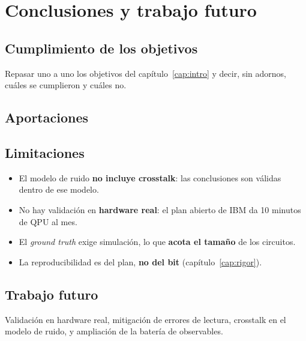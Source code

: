 \chapter{Conclusiones y trabajo futuro}
\label{cap:conclusiones}


\section{Cumplimiento de los objetivos}
\label{sec:cumplimiento}
Repasar uno a uno los objetivos del capítulo~\ref{cap:intro} y decir, sin adornos, cuáles se
cumplieron y cuáles no.

\section{Aportaciones}
\label{sec:aportaciones}

\section{Limitaciones}
\label{sec:limitaciones_finales}
\begin{itemize}
    \item El modelo de ruido \textbf{no incluye crosstalk}: las conclusiones son válidas
          dentro de ese modelo.
    \item No hay validación en \textbf{hardware real}: el plan abierto de IBM da 10 minutos
          de QPU al mes.
    \item El \textit{ground truth} exige simulación, lo que \textbf{acota el tamaño} de los
          circuitos.
    \item La reproducibilidad es del plan, \textbf{no del bit}
          (capítulo~\ref{cap:rigor}).
\end{itemize}

\section{Trabajo futuro}
\label{sec:futuro}
Validación en hardware real, mitigación de errores de lectura, crosstalk en el modelo de
ruido, y ampliación de la batería de observables.
